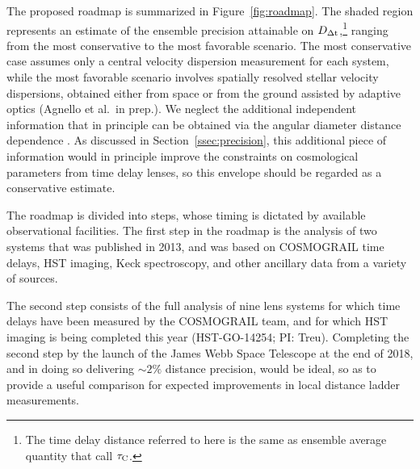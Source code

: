 The proposed roadmap is summarized in Figure~\ref{fig:roadmap}. The
shaded region represents an estimate of the ensemble precision attainable on
$D_{\Delta{\rm t}}$,\footnote{The time delay distance referred to here is the same as
ensemble average quantity that \citet{C+M09b} call $\mathcal{\tau}_{\rm C}$.}
ranging from the most conservative to the most favorable
scenario. The most conservative case assumes only a central velocity
dispersion measurement for each system, while the most favorable
scenario involves spatially resolved stellar velocity dispersions,
obtained either from space or from the ground assisted by adaptive optics
(Agnello et al.\ in prep.). We neglect the additional independent
information that in principle can be obtained via the angular
diameter distance dependence \citep{JeeEtal2016}.  As
discussed in Section~\ref{ssec:precision}, this additional piece of
information would in principle improve the constraints on cosmological
parameters from time delay lenses, so this envelope should be regarded
as a conservative estimate.

The roadmap is divided into steps, whose timing is dictated by
available observational facilities.
The first step in the roadmap is the analysis
of two systems that was published in 2013, and was based on COSMOGRAIL time
delays, HST imaging, Keck spectroscopy, and other ancillary data from
a variety of sources.

The second step consists of the full analysis of nine lens systems for
which time delays have been measured by the COSMOGRAIL team, and for
which HST imaging is being completed this year (HST-GO-14254; PI:
Treu).  Completing the second step by the launch of the James Webb
Space Telescope at the end of 2018, and in doing so delivering
$\sim2\%$ distance precision, would be ideal, so as to provide a
useful comparison for expected improvements in local distance ladder
measurements.

